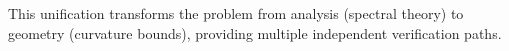 \begin{center}
\end{center}

This unification transforms the problem from analysis (spectral theory) to 
geometry (curvature bounds), providing multiple independent verification paths.




